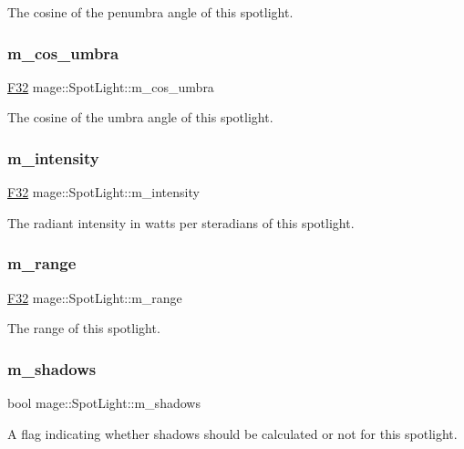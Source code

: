 The cosine of the penumbra angle of this spotlight. \hypertarget{classmage_1_1_spot_light_aa2ec430d0f95d082112260b5d9640d50}{}\label{classmage_1_1_spot_light_aa2ec430d0f95d082112260b5d9640d50} 
\subsubsection{\texorpdfstring{m\+\_\+cos\+\_\+umbra}{m\_cos\_umbra}}
{\footnotesize\ttfamily \hyperlink{namespacemage_aa97e833b45f06d60a0a9c4fc22ae02c0}{F32} mage\+::\+Spot\+Light\+::m\+\_\+cos\+\_\+umbra\hspace{0.3cm}{\ttfamily [private]}}

The cosine of the umbra angle of this spotlight. \hypertarget{classmage_1_1_spot_light_a79110b6604c73210ba13725be7b66606}{}\label{classmage_1_1_spot_light_a79110b6604c73210ba13725be7b66606} 
\subsubsection{\texorpdfstring{m\+\_\+intensity}{m\_intensity}}
{\footnotesize\ttfamily \hyperlink{namespacemage_aa97e833b45f06d60a0a9c4fc22ae02c0}{F32} mage\+::\+Spot\+Light\+::m\+\_\+intensity\hspace{0.3cm}{\ttfamily [private]}}

The radiant intensity in watts per steradians of this spotlight. \hypertarget{classmage_1_1_spot_light_a53922fe395997f12003cd2dbc2f3ca7a}{}\label{classmage_1_1_spot_light_a53922fe395997f12003cd2dbc2f3ca7a} 
\subsubsection{\texorpdfstring{m\+\_\+range}{m\_range}}
{\footnotesize\ttfamily \hyperlink{namespacemage_aa97e833b45f06d60a0a9c4fc22ae02c0}{F32} mage\+::\+Spot\+Light\+::m\+\_\+range\hspace{0.3cm}{\ttfamily [private]}}

The range of this spotlight. \hypertarget{classmage_1_1_spot_light_aa744a471d0f1b39eb5ee435611bb42fe}{}\label{classmage_1_1_spot_light_aa744a471d0f1b39eb5ee435611bb42fe} 
\subsubsection{\texorpdfstring{m\+\_\+shadows}{m\_shadows}}
{\footnotesize\ttfamily bool mage\+::\+Spot\+Light\+::m\+\_\+shadows\hspace{0.3cm}{\ttfamily [private]}}

A flag indicating whether shadows should be calculated or not for this spotlight. 